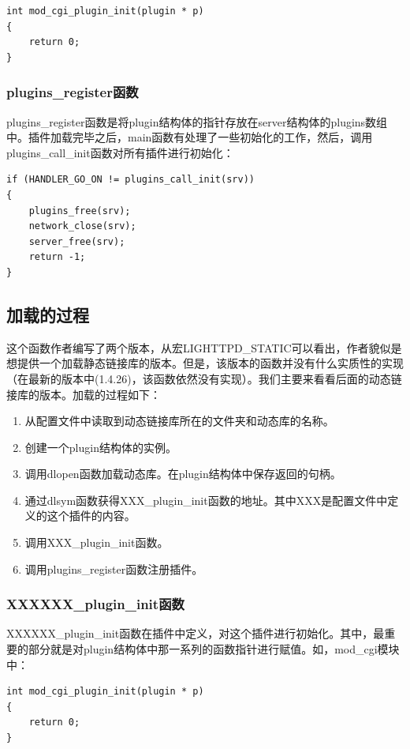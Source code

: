\documentclass[12pt, dvipdfm]{article}
\begin{document}
\begin{verbatim}
int mod_cgi_plugin_init(plugin * p)
{
	return 0;
}
\end{verbatim}


\subsubsection{plugins\_register函数}
plugins\_register函数是将plugin结构体的指针存放在server结构体的plugins数组中。插件加载完毕之后，main函数有处理了一些初始化的工作，然后，调用plugins\_call\_init函数对所有插件进行初始化：

\begin{verbatim}
if (HANDLER_GO_ON != plugins_call_init(srv)) 
{
	plugins_free(srv);
	network_close(srv);
	server_free(srv);
	return -1;
}
\end{verbatim}

\subsection{加载的过程}
这个函数作者编写了两个版本，从宏LIGHTTPD\_STATIC可以看出，作者貌似是想提供一个加载静态链接库的版本。但是，该版本的函数并没有什么实质性的实现（在最新的版本中(1.4.26)，该函数依然没有实现）。我们主要来看看后面的动态链接库的版本。加载的过程如下：
\begin{enumerate}
	\item 从配置文件中读取到动态链接库所在的文件夹和动态库的名称。
	\item 创建一个plugin结构体的实例。
	\item 调用dlopen函数加载动态库。在plugin结构体中保存返回的句柄。
	\item 通过dlsym函数获得XXX\_plugin\_init函数的地址。其中XXX是配置文件中定义的这个插件的内容。
	\item 调用XXX\_plugin\_init函数。
	\item 调用plugins\_register函数注册插件。
\end{enumerate}

\subsubsection{XXXXXX\_plugin\_init函数}
XXXXXX\_plugin\_init函数在插件中定义，对这个插件进行初始化。其中，最重要的部分就是对plugin结构体中那一系列的函数指针进行赋值。如，mod\_cgi模块中：

\begin{verbatim}
int mod_cgi_plugin_init(plugin * p)
{
	return 0;
}
\end{verbatim}
\end{document}

